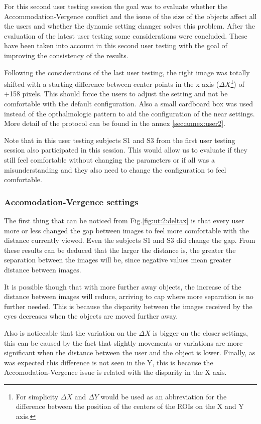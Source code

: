 \documentclass[10pt,a4paper,twocolumn,twoside]{article}
\begin{document}
	For this second user testing session the goal was to evaluate whether the Accommodation-Vergence conflict and the issue of the size of the objects affect all the users and whether the dynamic setting changer solves this problem. After the evaluation of the latest user testing some considerations were concluded. These have been taken into account in this second user testing with the goal of improving the consistency of the results. 
	
	Following the considerations of the last user testing, the right image was totally shifted with a starting difference between center points in the x axis ($\Delta X$\footnote{For simplicity  $\Delta X$ and $\Delta Y$ would be used as an abbreviation for the difference between the position of the centers of the ROIs on the X and Y axis. }) of +158 pixels. This should force the users to adjust the setting and not be comfortable with the default configuration. Also a small cardboard box was used instead of the opthalmologic pattern to aid the configuration of the near settings. More detail of the protocol can be found in the annex \ref{sec:annex:user2}.
	
	Note that in this user testing subjects S1 and S3 from the first user testing session also participated in this session. This would allow us to evaluate if they still feel comfortable without changing the parameters or if all was a misunderstanding and they also need to change the configuration to feel comfortable. 
	
	\subsubsection{Accomodation-Vergence settings}
	The first thing that can be noticed from Fig.\ref{fig:ut:2:deltax} is that every user more or less changed the gap between images to feel more comfortable with the distance currently viewed. Even the subjects S1 and S3 did change the gap. From these results can be deduced that the larger the distance is, the greater the separation between the images will be, since negative values mean greater distance between images. 
	
	It is possible though that with more further away objects, the increase of the distance between images will reduce, arriving to cap where more separation is no further needed. This is because the disparity between the images received by the eyes decreases when the objects are moved further away.
	
	Also is noticeable that the variation on the $\Delta X$ is bigger on the closer settings, this can be caused by the fact that slightly movements or variations are more significant when the distance between the user and the object is lower. 
	Finally, as was expected this difference is not seen in the Y, this is because the Accomodation-Vergence issue is related with the disparity in the X axis. 
	
\end{document}

